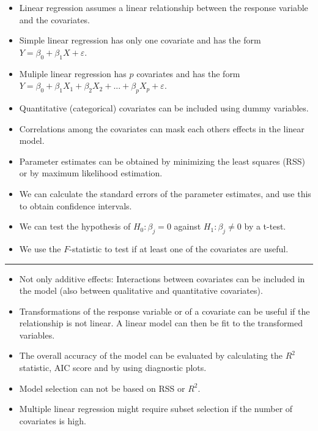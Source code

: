 \documentclass[]{article}
\providecommand{\tightlist}{%
  \setlength{\itemsep}{0pt}\setlength{\parskip}{0pt}}
\begin{document}
\begin{itemize}
\tightlist
\item
  Linear regression assumes a linear relationship between the response
  variable and the covariates.
\item
  Simple linear regression has only one covariate and has the form
  \(Y = \beta_0 + \beta_1 X + \varepsilon\).
\item
  Muliple linear regression has \(p\) covariates and has the form
  \(Y = \beta_0 + \beta_1 X_1 + \beta_2 X_2 + ... + \beta_p X_p + \varepsilon\).
\item
  Quantitative (categorical) covariates can be included using dummy
  variables.
\item
  Correlations among the covariates can mask each others effects in the
  linear model.
\item
  Parameter estimates can be obtained by minimizing the least squares
  (RSS) or by maximum likelihood estimation.
\item
  We can calculate the standard errors of the parameter estimates, and
  use this to obtain confidence intervals.
\item
  We can test the hypothesis of \(H_0 : \beta_j = 0\) against
  \(H_1: \beta_j \neq 0\) by a t-test.
\item
  We use the \(F\)-statistic to test if at least one of the covariates
  are useful.
\end{itemize}

\begin{center}\rule{0.5\linewidth}{\linethickness}\end{center}

\begin{itemize}
\item
  Not only additive effects: Interactions between covariates can be
  included in the model (also between qualitative and quantitative
  covariates).
\item
  Transformations of the response variable or of a covariate can be
  useful if the relationship is not linear. A linear model can then be
  fit to the transformed variables.
\item
  The overall accuracy of the model can be evaluated by calculating the
  \(R^2\) statistic, AIC score and by using diagnostic plots.
\item
  Model selection can not be based on RSS or \(R^2\).
\item
  Multiple linear regression might require subset selection if the
  number of covariates is high.
\end{itemize}
\end{document}
